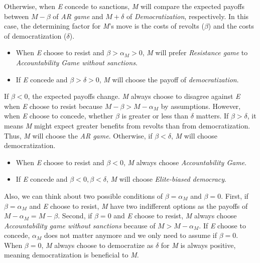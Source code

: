 \documentclass[11pt, letterpage, titlepage]{article}
\begin{document}
Otherwise, when \textit{E} concede to sanctions, \textit{M} will compare the expected payoffs between $M-\beta$ of \textit{AR game} and $M + \delta$ of \textit{Democratization}, respectively. In this case, the determining factor for \textit{M}'s move is the costs of revolts ($\beta$) and the costs of democratization ($\delta$).

\begin{itemize}
	\item When \textit{E} choose to resist and $\beta > \alpha_{M} > 0$, \textit{M} will prefer \textit{Resistance game} to \textit{Accountability Game without sanctions}.
	\item If \textit{E} concede and $\beta > \delta > 0$, \textit{M} will choose the payoff of \textit{democratization}.
\end{itemize}

If $\beta < 0$, the expected payoffs change. \textit{M} always choose to disagree against \textit{E} when \textit{E} choose to resist because $M-\beta > M-\alpha_{M}$ by assumptions. However, when \textit{E} choose to concede, whether $\beta$ is greater or less than $\delta$ matters. If $\beta > \delta$, it means \textit{M} might expect greater benefits from revolts than from democratization. Thus, \textit{M} will choose the \textit{AR game}. Otherwise, if $\beta < \delta$, \textit{M} will choose democratization.

\begin{itemize}
	\item When \textit{E} choose to resist and $\beta < 0$, \textit{M} always choose \textit{Accountability Game}.
	\item If \textit{E} concede and $\beta < 0, \beta < \delta$, \textit{M} will choose \textit{Elite-biased democracy}.
\end{itemize}

Also, we can think about two possible conditions of $\beta = \alpha_{M}$ and $\beta = 0$. First, if $\beta = \alpha_{M}$ and \textit{E} choose to resist, \textit{M} have two indifferent options as the payoffs of $M-\alpha_{M} = M-\beta$. Second, if $\beta = 0$ and \textit{E} choose to resist, \textit{M} always choose \textit{Accountability game without sanctions} because of $M > M-\alpha_{M}$. If \textit{E} choose to concede, $\alpha_{M}$ does not matter anymore and we only need to assume if $\beta = 0$. When $\beta = 0$, \textit{M} always choose to democratize as $\delta$ for \textit{M} is always positive, meaning democratization is beneficial to \textit{M}.
\end{document}
